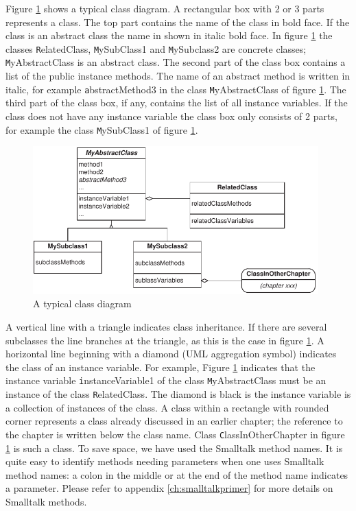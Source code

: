 Figure \ref{fig:classDiagram} shows a typical class diagram. A
rectangular box with 2 or 3 parts represents a class. The top part
contains the name of the class in bold face. If the class is an
abstract class the name in shown in italic bold face. In figure
\ref{fig:classDiagram} the classes {\texttt RelatedClass}, {\texttt
MySubClass1} and {\texttt MySubclass2} are concrete classes; {\texttt
MyAbstractClass} is an abstract class. The second part of the
class box contains a list of the public instance methods. The name
of an abstract method is written in italic, for example {\texttt
abstractMethod3} in the class {\texttt MyAbstractClass} of figure
\ref{fig:classDiagram}. The third part of the class box, if any,
contains the list of all instance variables. If the class does not
have any instance variable the class box only consists of 2 parts,
for example the class {\texttt MySubClass1} of figure
\ref{fig:classDiagram}.
\begin{figure}
\centering\includegraphics[width=11cm]{Figures/TypicalClassDiagram}
\caption{A typical class diagram} \label{fig:classDiagram}
\end{figure}

A vertical line with a triangle indicates class inheritance. If
there are several subclasses the line branches at the triangle, as
this is the case in figure \ref{fig:classDiagram}. A horizontal
line beginning with a diamond (UML aggregation symbol) indicates
the class of an instance variable. For example, Figure
\ref{fig:classDiagram} indicates that the instance variable {\texttt
instanceVariable1} of the class {\texttt MyAbstractClass} must be an
instance of the class {\texttt RelatedClass}. The diamond is black is
the instance variable is a collection of instances of the class. A
class within a rectangle with rounded corner represents a class
already discussed in an earlier chapter; the reference to the
chapter is written below the class name. Class {\texttt
ClassInOtherChapter} in figure \ref{fig:classDiagram} is such a
class. To save space, we have used the
Smalltalk method names. It is quite easy to identify methods
needing parameters when one uses Smalltalk method names: a
colon in the middle or at the end of the method name indicates
a parameter. Please refer to appendix \ref{ch:smalltalkprimer} for
more details on Smalltalk methods.

